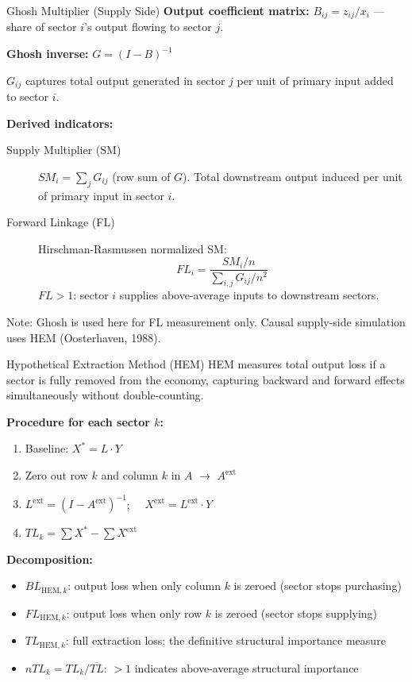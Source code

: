 \documentclass[aspectratio=169]{beamer}
\begin{document}
\begin{frame}{Ghosh Multiplier (Supply Side)}
\textbf{Output coefficient matrix:} $B_{ij} = z_{ij}/x_i$ --- share of sector $i$'s output flowing to sector $j$.

\textbf{Ghosh inverse:} $G = (I - B)^{-1}$

$G_{ij}$ captures total output generated in sector $j$ per unit of primary input added to sector $i$.

\medskip
\textbf{Derived indicators:}
\begin{description}
  \item[Supply Multiplier (SM)] $SM_i = \sum_j G_{ij}$ (row sum of $G$). Total downstream output induced per unit of primary input in sector $i$.
  \item[Forward Linkage (FL)] Hirschman-Rasmussen normalized SM:
  \[
  FL_i = \frac{SM_i / n}{\sum_{i,j} G_{ij} / n^2}
  \]
  $FL > 1$: sector $i$ supplies above-average inputs to downstream sectors.
\end{description}

\medskip
\small Note: Ghosh is used here for FL measurement only. Causal supply-side simulation uses HEM (Oosterhaven, 1988).
\end{frame}

\begin{frame}{Hypothetical Extraction Method (HEM)}
HEM measures total output loss if a sector is fully removed from the economy, capturing backward and forward effects simultaneously without double-counting.

\medskip
\textbf{Procedure for each sector $k$:}
\begin{enumerate}
  \item Baseline: $X^* = L \cdot Y$
  \item Zero out row $k$ and column $k$ in $A$ $\to$ $A^{\text{ext}}$
  \item $L^{\text{ext}} = (I - A^{\text{ext}})^{-1}$; $\quad X^{\text{ext}} = L^{\text{ext}} \cdot Y$
  \item $TL_k = \sum X^* - \sum X^{\text{ext}}$
\end{enumerate}

\medskip
\textbf{Decomposition:}
\begin{itemize}
  \item $BL_{\text{HEM},k}$: output loss when only column $k$ is zeroed (sector stops purchasing)
  \item $FL_{\text{HEM},k}$: output loss when only row $k$ is zeroed (sector stops supplying)
  \item $TL_{\text{HEM},k}$: full extraction loss; the definitive structural importance measure
  \item $nTL_k = TL_k / \overline{TL}$: $>1$ indicates above-average structural importance
\end{itemize}
\end{frame}
\end{document}
